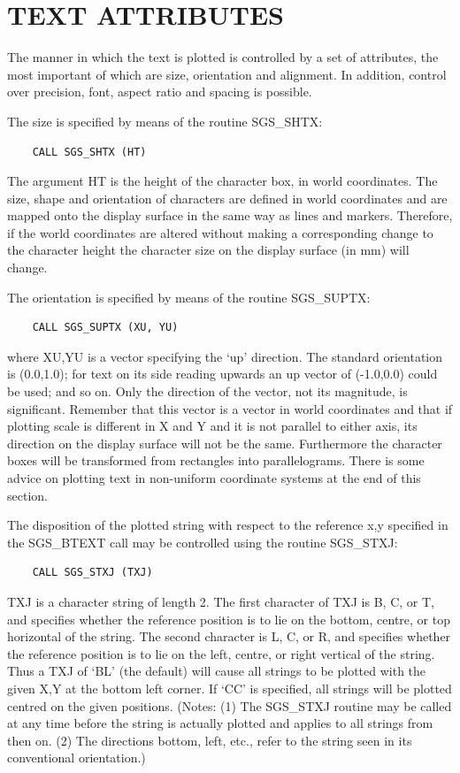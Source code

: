 \documentclass[11pt]{article}
\newcommand{\htmlref}[2]{#1}
\begin{document}
\section {TEXT ATTRIBUTES}

The manner in which the text is plotted is controlled by a set
of attributes, the most important of which
are size, orientation and alignment.  In addition,
control over precision, font, aspect ratio and spacing is
possible.

The size is specified by means of the routine \htmlref{SGS\_SHTX}{SGS_SHTX}:
\begin{verbatim}
    CALL SGS_SHTX (HT)
\end{verbatim}
The argument HT is the height of the character box, in world
coordinates.  The size, shape and orientation of characters are defined
in world coordinates and are mapped onto the display surface in
the same way as lines and markers.  Therefore, 
if the world coordinates are altered
without making a corresponding change to the character height the character
size on the display surface (in mm) will change.

The orientation is specified by means of the routine 
\htmlref{SGS\_SUPTX}{SGS_SUPTX}:
\begin{verbatim}
    CALL SGS_SUPTX (XU, YU)
\end{verbatim}
where XU,YU is a vector specifying the `up'
direction.  The standard orientation is (0.0,1.0);  for
text on its side reading upwards an up vector of (-1.0,0.0) could
be used;  and so on.  Only the direction of the vector, not its
magnitude, is significant.  Remember that this vector is a vector in world
coordinates and that if plotting scale is different in X and Y and it is
not parallel to either axis, its direction on the display surface will not 
be the same.  Furthermore the character boxes will be transformed from
rectangles into parallelograms.  There is some advice on plotting text in 
non-uniform coordinate systems at the end of this section.

The disposition of the plotted string with respect to
the reference x,y
specified in the \htmlref{SGS\_BTEXT}{SGS_BTEXT}
call may be controlled using the
routine \htmlref{SGS\_STXJ}{SGS_STXJ}:
\begin{verbatim}
    CALL SGS_STXJ (TXJ)
\end{verbatim}
TXJ is a character string of length 2.  The first character of TXJ
is B, C, or T, and specifies whether the reference position is to lie
on the bottom, centre, or top horizontal of the string.  The second
character is L, C, or R, and specifies whether the reference position
is to lie on the left, centre, or right vertical of the string.  Thus
a TXJ of `BL' (the default) will cause all strings to be plotted
with the given X,Y at the bottom left corner.  If `CC' is specified,
all strings will be plotted centred on the given
positions.  (Notes:  (1) The
SGS\_STXJ routine may be called at any time before the string is actually
plotted and applies to all strings from then on.  (2) The directions
bottom, left, etc., refer to the string seen in its conventional
orientation.)
\end{document}
